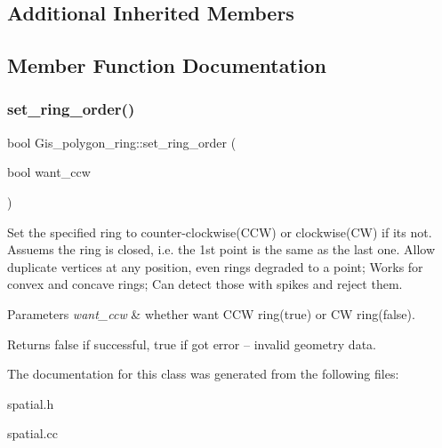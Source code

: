 \subsection*{Additional Inherited Members}


\subsection{Member Function Documentation}
\mbox{\label{classGis__polygon__ring_a2807ddb3d4e769048a73c115416f5bd8}} 
\subsubsection{\texorpdfstring{set\+\_\+ring\+\_\+order()}{set\_ring\_order()}}
{\footnotesize\ttfamily bool Gis\+\_\+polygon\+\_\+ring\+::set\+\_\+ring\+\_\+order (\begin{DoxyParamCaption}\item[{bool}]{want\+\_\+ccw }\end{DoxyParamCaption})}

Set the specified ring to counter-\/clockwise(\+C\+C\+W) or clockwise(\+C\+W) if it\textquotesingle{}s not. Assuems the ring is closed, i.\+e. the 1st point is the same as the last one. Allow duplicate vertices at any position, even rings degraded to a point; Works for convex and concave rings; Can detect those with spikes and reject them.


\begin{DoxyParams}{Parameters}
{\em want\+\_\+ccw} & whether want C\+CW ring(true) or CW ring(false). \\
\hline
\end{DoxyParams}
\begin{DoxyReturn}{Returns}
false if successful, true if got error -- invalid geometry data. 
\end{DoxyReturn}


The documentation for this class was generated from the following files\+:\begin{DoxyCompactItemize}
\item 
spatial.\+h\item 
spatial.\+cc\end{DoxyCompactItemize}
